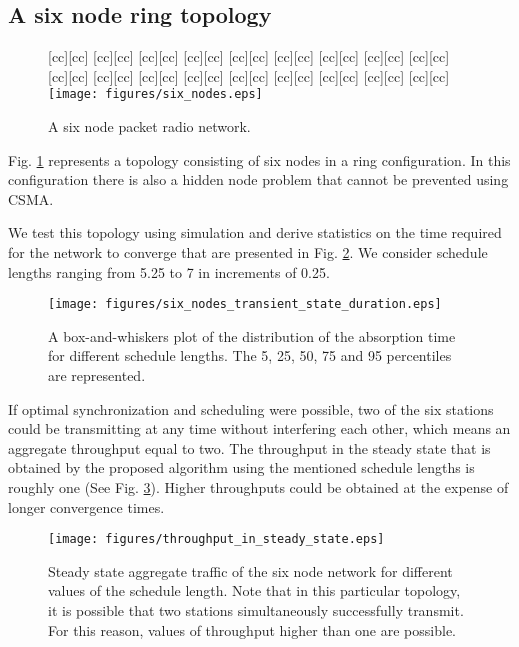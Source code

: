 \documentclass[twocolumn]{svjour3}          \smartqed  \usepackage{graphicx}
\begin{document}
\subsection{A six node ring topology}

\begin{figure}[]
[cc][cc]{}
[cc][cc]{}
[cc][cc]{}
[cc][cc]{}
[cc][cc]{}
[cc][cc]{}
[cc][cc]{}
[cc][cc]{}
[cc][cc]{}
[cc][cc]{}
[cc][cc]{}
[cc][cc]{}
[cc][cc]{}
[cc][cc]{}
[cc][cc]{}
[cc][cc]{}
[cc][cc]{}
[cc][cc]{}
\centering
\texttt{[image: figures/six\_nodes.eps]}
\caption{A six node packet radio network.}
\label{fig:six_nodes}
\end{figure}

Fig. \ref{fig:six_nodes} represents a topology consisting of six nodes in a ring configuration.
In this configuration there is also a hidden node problem that cannot be prevented using CSMA.

We test this topology using simulation and derive statistics on the time required for the network to converge that are presented in Fig. \ref{fig:six_nodes_transient_state_duration}.
We consider schedule lengths ranging from 5.25 to 7 in increments of 0.25.

\begin{figure}
\centering
  \texttt{[image: figures/six\_nodes\_transient\_state\_duration.eps]}
\caption{A box-and-whiskers plot of the distribution of the absorption time for different schedule lengths. The 5, 25, 50, 75 and 95 percentiles are represented.}
\label{fig:six_nodes_transient_state_duration}
\end{figure}

If optimal synchronization and scheduling were possible, two of the six stations could be transmitting at any time without interfering each other, which means an aggregate throughput equal to two.
The throughput in the steady state that is obtained by the proposed algorithm using the mentioned schedule lengths is roughly one (See Fig. \ref{fig:throughput_in_steady_state}).
Higher throughputs could be obtained at the expense of longer convergence times.

\begin{figure}
\centering
  \texttt{[image: figures/throughput\_in\_steady\_state.eps]}
\caption{Steady state aggregate traffic of the six node network for different values of the schedule length. Note that in this particular topology, it is possible that two stations simultaneously successfully transmit. For this reason, values of throughput higher than one are possible.}
\label{fig:throughput_in_steady_state}
\end{figure}
\end{document}
